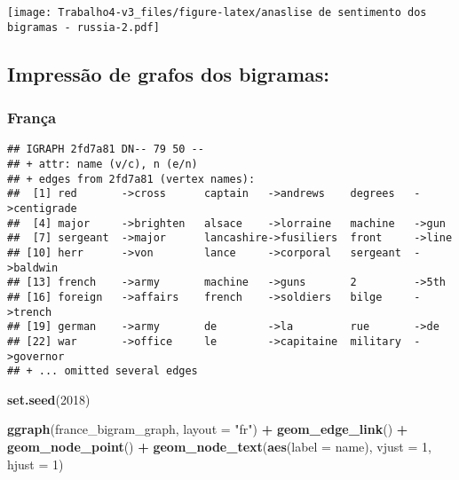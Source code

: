 \documentclass[]{article}
\newenvironment{Shaded}{\begin{snugshade}}{\end{snugshade}}
\newcommand{\DataTypeTok}[1]{\textcolor[rgb]{0.13,0.29,0.53}{#1}}
\newcommand{\DecValTok}[1]{\textcolor[rgb]{0.00,0.00,0.81}{#1}}
\newcommand{\KeywordTok}[1]{\textcolor[rgb]{0.13,0.29,0.53}{\textbf{#1}}}
\newcommand{\NormalTok}[1]{#1}
\newcommand{\OperatorTok}[1]{\textcolor[rgb]{0.81,0.36,0.00}{\textbf{#1}}}
\newcommand{\StringTok}[1]{\textcolor[rgb]{0.31,0.60,0.02}{#1}}
\begin{document}
\texttt{[image: Trabalho4-v3\_files/figure-latex/anaslise de sentimento dos bigramas - russia-2.pdf]}

\hypertarget{impressao-de-grafos-dos-bigramas}{%
\subsection{Impressão de grafos dos
bigramas:}\label{impressao-de-grafos-dos-bigramas}}

\hypertarget{franca-5}{%
\subsubsection{França}\label{franca-5}}

\begin{Shaded}
\end{Shaded}

\begin{verbatim}
## IGRAPH 2fd7a81 DN-- 79 50 -- 
## + attr: name (v/c), n (e/n)
## + edges from 2fd7a81 (vertex names):
##  [1] red       ->cross      captain   ->andrews    degrees   ->centigrade
##  [4] major     ->brighten   alsace    ->lorraine   machine   ->gun       
##  [7] sergeant  ->major      lancashire->fusiliers  front     ->line      
## [10] herr      ->von        lance     ->corporal   sergeant  ->baldwin   
## [13] french    ->army       machine   ->guns       2         ->5th       
## [16] foreign   ->affairs    french    ->soldiers   bilge     ->trench    
## [19] german    ->army       de        ->la         rue       ->de        
## [22] war       ->office     le        ->capitaine  military  ->governor  
## + ... omitted several edges
\end{verbatim}

\begin{Shaded}
\begin{Highlighting}[]
\KeywordTok{set.seed}\NormalTok{(}\DecValTok{2018}\NormalTok{)}

\KeywordTok{ggraph}\NormalTok{(france_bigram_graph, }\DataTypeTok{layout =} \StringTok{"fr"}\NormalTok{) }\OperatorTok{+}
\StringTok{  }\KeywordTok{geom_edge_link}\NormalTok{() }\OperatorTok{+}
\StringTok{  }\KeywordTok{geom_node_point}\NormalTok{() }\OperatorTok{+}
\StringTok{  }\KeywordTok{geom_node_text}\NormalTok{(}\KeywordTok{aes}\NormalTok{(}\DataTypeTok{label =}\NormalTok{ name), }\DataTypeTok{vjust =} \DecValTok{1}\NormalTok{, }\DataTypeTok{hjust =} \DecValTok{1}\NormalTok{)}
\end{Highlighting}
\end{Shaded}
\end{document}
